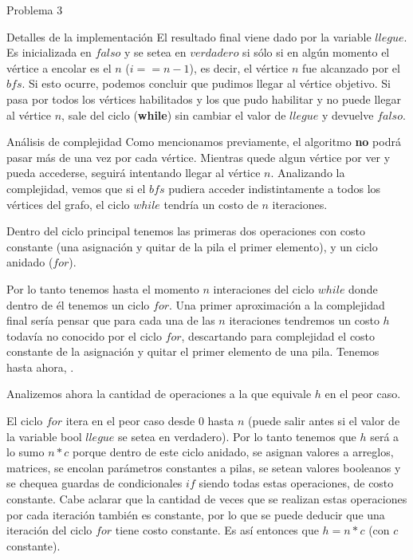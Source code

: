 \begin{section}{Problema 3}
\begin{subsection}{Detalles de la implementación}
		El resultado final viene dado por la variable $llegue$. Es inicializada en $falso$ y se setea en $verdadero$ si sólo si en algún momento el vértice a encolar es el $n$ ($i == n-1$), es decir, el vértice $n$ fue alcanzado por el $bfs$. Si esto ocurre, podemos concluir que pudimos llegar al vértice objetivo. Si pasa por todos los vértices habilitados y los que pudo habilitar y no puede llegar al vértice $n$, sale del ciclo (\textbf{while}) sin cambiar el valor de $llegue$ y devuelve $falso$.
		
	\end{subsection}


	\begin{subsection}{Análisis de complejidad}
		Como mencionamos previamente, el algoritmo \textbf{no} podrá pasar más de una vez por cada vértice. Mientras quede algun vértice por ver y pueda accederse, seguirá intentando llegar al vértice $n$. Analizando la complejidad, vemos que si el $bfs$ pudiera acceder indistintamente a todos los vértices del grafo, el ciclo $while$ tendría un costo de $n$ iteraciones.
		
		Dentro del ciclo principal tenemos las primeras dos operaciones con costo constante (una asignación y quitar de la pila el primer elemento), y un ciclo anidado ($for$).
		
		Por lo tanto tenemos hasta el momento $n$ interaciones del ciclo $while$ donde dentro de él tenemos un ciclo $for$. Una primer aproximación a la complejidad final sería pensar que para cada una de las $n$ iteraciones tendremos un costo $h$ todavía no conocido por el ciclo $for$, descartando para complejidad el costo constante de la asignación y quitar el primer elemento de una pila. Tenemos hasta ahora, .
		
		Analizemos ahora la cantidad de operaciones a la que equivale $h$ en el peor caso.
		
		El ciclo $for$ itera en el peor caso desde $0$ hasta $n$ (puede salir antes si el valor de la variable bool $llegue$ se setea en verdadero). Por lo tanto tenemos que $h$ será a lo sumo $n*c$ porque dentro de este ciclo anidado, se asignan valores a arreglos, matrices, se encolan parámetros constantes a pilas, se setean valores booleanos y se chequea guardas de condicionales $if$ siendo todas estas operaciones, de costo constante. Cabe aclarar que la cantidad de veces que se realizan estas operaciones por cada iteración también es constante, por lo que se puede deducir que una iteración del ciclo $for$ tiene costo constante. Es así entonces que $h = n*c$ (con $c$ constante).
		

\end{subsection}
\end{section}
